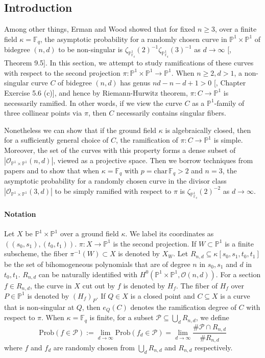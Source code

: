 \documentclass[12pt]{article}
\theoremstyle{plain}
\theoremstyle{definition}
\newcommand{\IF}{\mathbb{F}}
\newcommand{\IP}{\mathbb{P}}
\newcommand{\sO}{\mathcal{O}}
\newcommand{\sP}{\mathcal{P}}
\newcommand\union{\bigcup}
\newcommand{\<}{\langle}
\renewcommand{\>}{\rangle}
\newcommand{\Prob}{\mathrm{Prob}}
\begin{document}
\subsection{Introduction}
Among other things, Erman and Wood showed that for fixed $n \ge 3$, over a finite field $\kappa = \IF_q$, the asymptotic probability for a randomly chosen curve in $\IP^1 \times \IP^1$ of bidegree $(n, d)$ to be non-singular is $\zeta_{\IP^1_{\IF_q}}(2)^{-1}\zeta_{\IP^1_{\IF_q}}(3)^{-1}$ as $d \to \infty$ [\cite{Wood}, Theorem 9.5].
In this section, we attempt to study ramifications of these curves with respect to the second projection $\pi: \IP^1 \times \IP^1 \to \IP^1$. When $n \ge 2, d > 1$, a non-singular curve $C$ of bidegree $(n, d)$ has genus $nd - n - d + 1 >  0$ [\cite{Hartshorne}, Chapter \uppercase\expandafter{} Exercise 5.6 (c)], and hence by Riemann-Hurwitz theorem, $\pi : C \to \IP^1$ is necessarily ramified. In other words, if we view the curve $C$ as a $\IP^1$-family of three collinear points via $\pi$, then $C$ necessarily contains singular fibers.  

Nonetheless we can show that if the ground field $\kappa$ is algebraically closed, then for a sufficiently general choice of $C$, the ramification of $\pi : C \to \IP^1$ is simple. Moreover, the set of the curves with this property forms a dense subset of $|\sO_{\IP^1 \times \IP^1}(n, d)|$, viewed as a projective space. Then we borrow techniques from papers \cite{Poonen} and \cite{Wood} to show that when $\kappa = \IF_q$ with $p = \mathrm{char}\, \IF_q > 2$ and $n = 3$, the asymptotic probability for a randomly chosen curve in the divisor class $|\sO_{\IP^1 \times \IP^1}(3, d)|$ to be simply ramified with respect to $\pi$ is $\zeta_{\IP^1_{\IF_q}}(2)^{-2}$ as $d \to \infty$. 
 


\paragraph{Notation} 
Let $X$ be $\IP^1 \times \IP^1$ over a ground field $\kappa$. We label its coordinates as $((s_0, s_1), (t_0, t_1))$. $\pi : X \to \IP^1$ is the second projection. If $W \subset \IP^1$ is a finite subscheme, the fiber $\pi^{-1}(W) \subset X$ is denoted by $X_W$. Let $R_{n, d} \subseteq \kappa[s_0, s_1, t_0, t_1]$ be the set of bihomogeneous polynomials that are of degree $n$ in $s_0, s_1$ and $d$ in $t_0, t_1$. $R_{n, d}$ can be naturally identified with $H^0(\IP^1 \times \IP^1, \sO(n, d))$. For a section $f \in R_{n, d}$, the curve in $X$ cut out by $f$ is denoted by $H_f$. The fiber of $H_f$ over $P \in \IP^1$ is denoted by $(H_f)_P$. If $Q \in X$ is a closed point and $C \subseteq X$ is a curve that is non-singular at $Q$, then $e_Q(C)$ denotes the ramification degree of $C$ with respect to $\pi$. When $\kappa = \IF_q$ is finite, for a subset $\sP \subseteq \union_d R_{n, d}$, we define 
$$ \Prob(f \in \sP) := \lim_{d \to \infty}\Prob(f_d \in \sP) = \lim_{d \to \infty} \frac{\# \sP \cap R_{n, d}}{\# R_{n, d}}$$
where $f$ and $f_d$ are randomly chosen from $\union_{d} R_{n, d}$ and $R_{n, d}$ respectively. 
\end{document}
